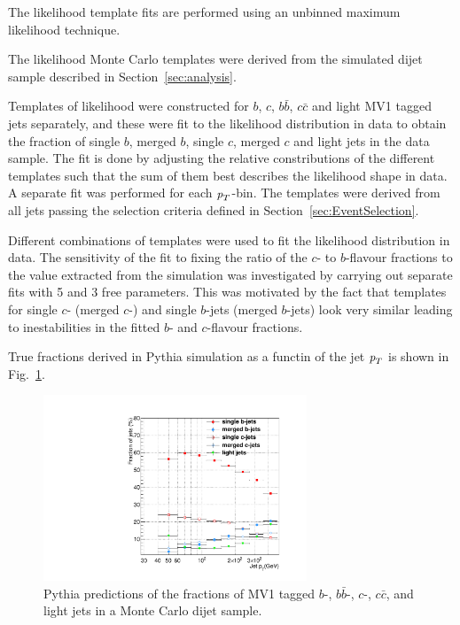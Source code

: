 The likelihood template fits are performed using an unbinned maximum likelihood technique.

The likelihood Monte Carlo templates were derived from the simulated dijet sample described in Section~\ref{sec:analysis}.

Templates of likelihood were constructed for $b$, $c$, $b\bar{b}$, $c\bar{c}$ and light MV1 tagged jets separately, and these were fit to the likelihood distribution in data to obtain the fraction of single $b$, merged $b$, single $c$, merged $c$ and light jets in the data sample.  The fit is done by adjusting the relative constributions of the different templates such that the sum of them best describes the likelihood shape in data. A separate fit was performed for each ${\emph{p}_{T}}$-bin.  The templates were derived from all jets passing the selection criteria defined in Section~\ref{sec:EventSelection}.


Different combinations of templates were used to fit the likelihood distribution in data. 
The sensitivity of the fit to fixing the ratio of the $c$- to $b$-flavour fractions to the value extracted from the simulation was investigated by carrying out separate fits with 5 and 3 free parameters. This was motivated by the fact that templates for single $c$- (merged $c$-)  and single $b$-jets (merged $b$-jets) look very similar leading to inestabilities in the fitted $b$- and $c$-flavour fractions.




True fractions derived in {\sc Pythia} simulation as a functin of the jet ${\emph{p}_{T}}$ is shown in Fig.~\ref{fig:truefractions}.


\begin{figure}[tp]
\centering
\includegraphics[width=0.7\textwidth]{TrueFractions_NominalPythia.pdf}
\caption{Pythia predictions of the fractions of MV1 tagged $b$-, $b\bar{b}$-, $c$-, $c\bar{c}$, and light jets in a Monte Carlo dijet sample.}
\label{fig:truefractions}
\end{figure}





